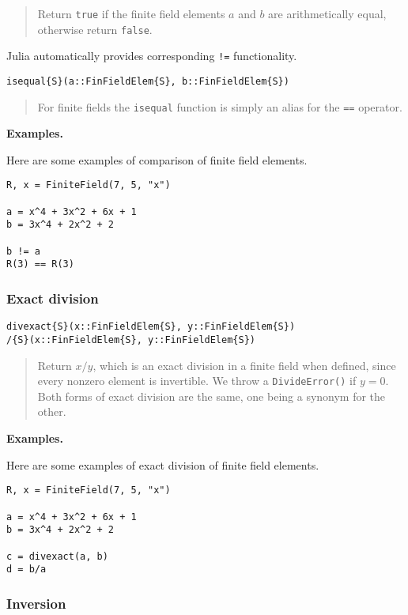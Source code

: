\documentclass[a4paper,10pt]{article}
\newcommand{\code}{\lstinline}
\newcommand{\desc}[1]{\vspace{-3mm}\begin{quote}#1\end{quote}}
\begin{document}
{{\desc{Return \code{true} if the finite field elements $a$ and $b$ are 
arithmetically equal, otherwise return \code{false}.}

Julia automatically provides corresponding \code{!=} functionality.

\begin{lstlisting}
isequal{S}(a::FinFieldElem{S}, b::FinFieldElem{S})
\end{lstlisting}

\desc{For finite fields the \code{isequal} function is simply an alias for
the \code{==} operator.}

\textbf{Examples.}

Here are some examples of comparison of finite field elements.

\begin{lstlisting}
R, x = FiniteField(7, 5, "x")

a = x^4 + 3x^2 + 6x + 1
b = 3x^4 + 2x^2 + 2

b != a
R(3) == R(3)
\end{lstlisting}

\subsubsection{Exact division}

\begin{lstlisting}
divexact{S}(x::FinFieldElem{S}, y::FinFieldElem{S})
/{S}(x::FinFieldElem{S}, y::FinFieldElem{S})
\end{lstlisting}

\desc{Return $x/y$, which is an exact division in a finite field when defined,
since every nonzero element is invertible. We throw a \code{DivideError()} if
$y = 0$. Both forms of exact division are the same, one being a synonym for 
the other.}

\textbf{Examples.}

Here are some examples of exact division of finite field elements.

\begin{lstlisting}
R, x = FiniteField(7, 5, "x")

a = x^4 + 3x^2 + 6x + 1
b = 3x^4 + 2x^2 + 2

c = divexact(a, b)
d = b/a
\end{lstlisting}

\subsubsection{Inversion}

}}
\end{document}
